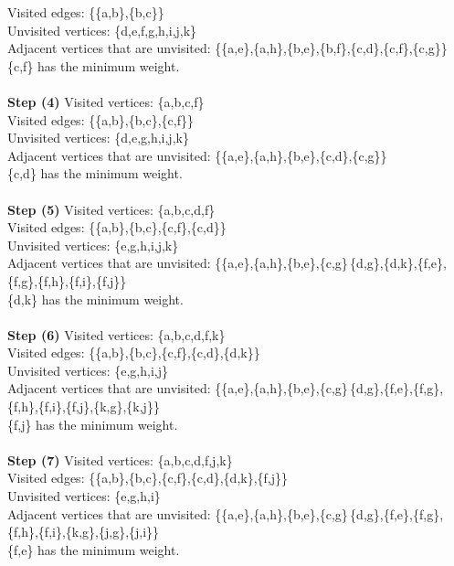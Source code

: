 \documentclass[11pt]{article}
\begin{document}
Visited edges: \{\{a,b\},\{b,c\}\}\\
Unvisited vertices: \{d,e,f,g,h,i,j,k\}\\
Adjacent vertices that are unvisited: \{\{a,e\},\{a,h\},\{b,e\},\{b,f\},\{c,d\},\{c,f\},\{c,g\}\}\\
\{c,f\} has the minimum weight.
\\ \\
\textbf{Step (4)} 
Visited vertices: \{a,b,c,f\}\\
Visited edges: \{\{a,b\},\{b,c\},\{c,f\}\}\\
Unvisited vertices: \{d,e,g,h,i,j,k\}\\
Adjacent vertices that are unvisited: \{\{a,e\},\{a,h\},\{b,e\},\{c,d\},\{c,g\}\}\\
\{c,d\} has the minimum weight.
\\ \\
\textbf{Step (5)} 
Visited vertices: \{a,b,c,d,f\}\\
Visited edges: \{\{a,b\},\{b,c\},\{c,f\},\{c,d\}\}\\
Unvisited vertices: \{e,g,h,i,j,k\}\\
Adjacent vertices that are unvisited: \{\{a,e\},\{a,h\},\{b,e\},\{c,g\}\,\{d,g\},\{d,k\},\{f,e\},\{f,g\},\{f,h\},\{f,i\},\{f,j\}\}\\
\{d,k\} has the minimum weight.
\\ \\
\textbf{Step (6)} 
Visited vertices: \{a,b,c,d,f,k\}\\
Visited edges: \{\{a,b\},\{b,c\},\{c,f\},\{c,d\},\{d,k\}\}\\
Unvisited vertices: \{e,g,h,i,j\}\\
Adjacent vertices that are unvisited: \{\{a,e\},\{a,h\},\{b,e\},\{c,g\}\,\{d,g\},\{f,e\},\{f,g\},\{f,h\},\{f,i\},\{f,j\},\{k,g\},\{k,j\}\}\\
\{f,j\} has the minimum weight.
\\ \\
\textbf{Step (7)} 
Visited vertices: \{a,b,c,d,f,j,k\}\\
Visited edges: \{\{a,b\},\{b,c\},\{c,f\},\{c,d\},\{d,k\},\{f,j\}\}\\
Unvisited vertices: \{e,g,h,i\}\\
Adjacent vertices that are unvisited: \{\{a,e\},\{a,h\},\{b,e\},\{c,g\}\,\{d,g\},\{f,e\},\{f,g\},\{f,h\},\{f,i\},\{k,g\},\{j,g\},\{j,i\}\}\\
\{f,e\} has the minimum weight.
\\ \\
\end{document}
